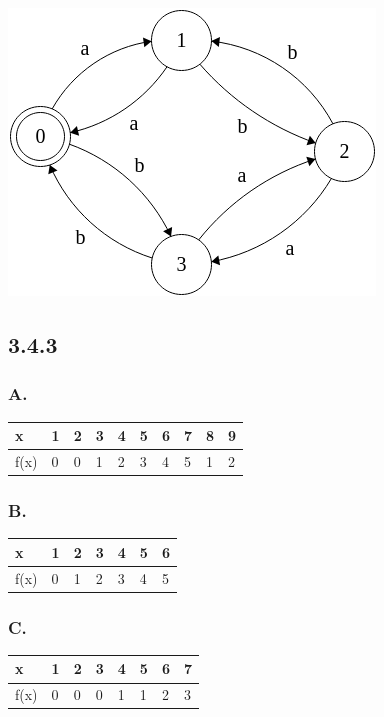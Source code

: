 \documentclass{article}
\begin{document}
\begin{center}
\includegraphics[scale=.5]{e}
\end{center}

\subsection*{3.4.3}
\subsubsection*{A.}
\begin{table}[h]
\begin{tabular}{|l|l|l|l|l|l|l|l|l|l|}
\hline
x    & 1 & 2 & 3 & 4 & 5 & 6 & 7 & 8 & 9 \\ \hline
f(x) & 0 & 0 & 1 & 2 & 3 & 4 & 5 & 1 & 2 \\ \hline
\end{tabular}
\end{table}
\subsubsection*{B.}
\begin{table}[h]
\begin{tabular}{|l|l|l|l|l|l|l|}
\hline
x    & 1 & 2 & 3 & 4 & 5 & 6 \\ \hline
f(x) & 0 & 1 & 2 & 3 & 4 & 5 \\ \hline
\end{tabular}
\end{table}
\subsubsection*{C.}
\begin{table}[h]
\begin{tabular}{|l|l|l|l|l|l|l|l|}
\hline
x    & 1 & 2 & 3 & 4 & 5 & 6 & 7 \\ \hline
f(x) & 0 & 0 & 0 & 1 & 1 & 2 & 3 \\ \hline
\end{tabular}
\end{table}
\end{document}
